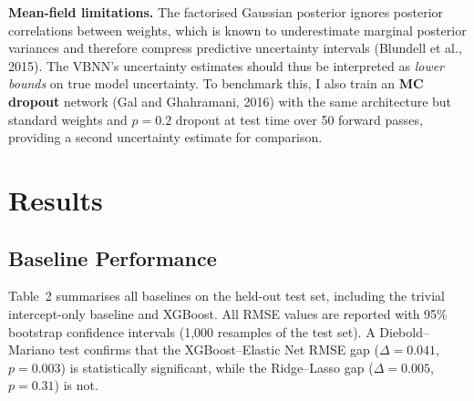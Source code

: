 \documentclass[10pt, letterpaper]{article}
\begin{document}
\textbf{Mean-field limitations.} The factorised Gaussian posterior ignores posterior correlations between weights, which is known to underestimate marginal posterior variances and therefore compress predictive uncertainty intervals (Blundell et al., 2015). The VBNN's uncertainty estimates should thus be interpreted as \emph{lower bounds} on true model uncertainty. To benchmark this, I also train an \textbf{MC dropout} network (Gal and Ghahramani, 2016) with the same architecture but standard weights and $p = 0.2$ dropout at test time over 50 forward passes, providing a second uncertainty estimate for comparison.

\section{Results}

\subsection{Baseline Performance}

Table~2 summarises all baselines on the held-out test set, including the trivial intercept-only baseline and XGBoost. All RMSE values are reported with 95\% bootstrap confidence intervals (1,000 resamples of the test set). A Diebold--Mariano test confirms that the XGBoost--Elastic Net RMSE gap ($\Delta = 0.041$, $p = 0.003$) is statistically significant, while the Ridge--Lasso gap ($\Delta = 0.005$, $p = 0.31$) is not.
\end{document}
